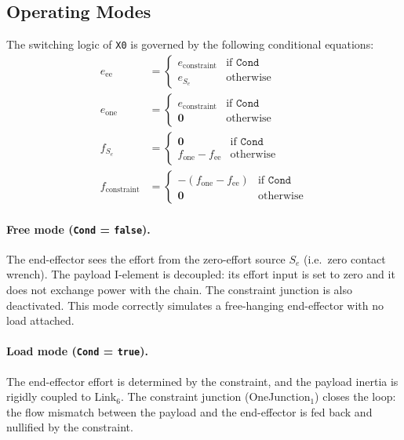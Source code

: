 \subsection{Operating Modes}

The switching logic of \texttt{X0} is governed by the following conditional equations:
\begin{align}
  e_{\text{ee}}      &= \begin{cases} e_{\text{constraint}} & \text{if } \texttt{Cond} \\ e_{S_e} & \text{otherwise} \end{cases} \\
  e_{\text{one}}     &= \begin{cases} e_{\text{constraint}} & \text{if } \texttt{Cond} \\ \mathbf{0} & \text{otherwise} \end{cases} \\
  f_{S_e}            &= \begin{cases} \mathbf{0} & \text{if } \texttt{Cond} \\ f_{\text{one}} - f_{\text{ee}} & \text{otherwise} \end{cases} \\
  f_{\text{constraint}} &= \begin{cases} -(f_{\text{one}} - f_{\text{ee}}) & \text{if } \texttt{Cond} \\ \mathbf{0} & \text{otherwise} \end{cases}
\end{align}

\paragraph{Free mode (\texttt{Cond} = \texttt{false}).}
The end-effector sees the effort from the zero-effort source $S_e$ (i.e.\ zero contact wrench).
The payload I-element is decoupled: its effort input is set to zero and it does not exchange power with the chain.
The constraint junction is also deactivated.
This mode correctly simulates a free-hanging end-effector with no load attached.

\paragraph{Load mode (\texttt{Cond} = \texttt{true}).}
The end-effector effort is determined by the constraint, and the payload inertia is rigidly coupled to Link$_6$.
The constraint junction (OneJunction$_1$) closes the loop: the flow mismatch between the payload and the end-effector is fed back and nullified by the constraint.

